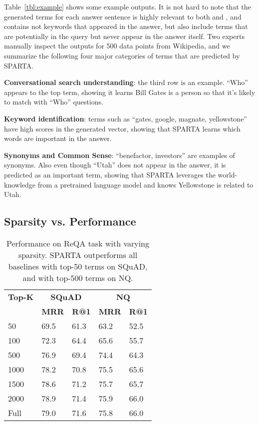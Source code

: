 \documentclass[11pt,a4paper]{article}
\begin{document}
Table~\ref{tbl:example} shows some example outputs. It is not hard to note that the generated terms for each answer sentence is highly relevant to both  and , and contains not keywords that appeared in the answer, but also include terms that are potentially in the query but never appear in the answer itself. Two experts manually inspect the outputs for 500  data points from Wikipedia, and we summarize the following four major categories of terms that are predicted by SPARTA.  

\textbf{Conversational search understanding}: the third row is an example. ``Who'' appears to the top term, showing it learns Bill Gates is a person so that it's likely to match with ``Who'' questions. 

\textbf{Keyword identification}: terms such as ``gates, google, magnate, yellowstone'' have high scores in the generated vector, showing that SPARTA learns which words are important in the answer.



\textbf{Synonyms and Common Sense}: ``benefactor, investors'' are examples of synonyms. Also even though ``Utah'' does not appear in the answer, it is predicted as an important term, showing that SPARTA leverages the world-knowledge from a pretrained language model and knows Yellowstone is related to Utah.



\subsection{Sparsity vs. Performance}
\begin{table}[]
\centering
\begin{tabular}{l|ll|ll} \hline
\textbf{Top-K} & \multicolumn{2}{c|}{\textbf{SQuAD}} & \multicolumn{2}{c}{\textbf{NQ}}     \\ 
                       & \textbf{MRR}       & \textbf{R@1}       & \textbf{MRR}   &  \textbf{R@1}  \\ \hline

50    & 69.5 & 61.3 & 63.2 & 52.5 \\
100   & 72.3 & 64.4 & 65.6 & 55.7 \\
500   & 76.9 & 69.4 & 74.4 & 64.3 \\
1000  & 78.2 & 70.8 & 75.5 & 65.6 \\
1500  & 78.6 & 71.2 & 75.7 &  65.7 \\
2000  & 78.9 & 71.4 & 75.9 & 66.0 \\
Full  & 79.0 & 71.6 & 75.8 & 66.0 \\ \hline
\end{tabular}
\caption{Performance on ReQA task with varying sparsity. SPARTA outperforms all baselines with top-50 terms on SQuAD, and with top-500 terms on NQ.}
\label{tbl:sparsity}
\end{table}
\end{document}
